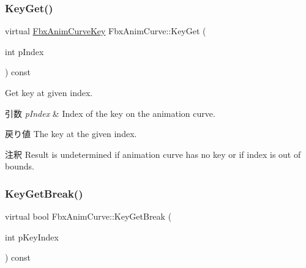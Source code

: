 \subsubsection{\texorpdfstring{Key\+Get()}{KeyGet()}}
{\footnotesize\ttfamily virtual \hyperlink{class_fbx_anim_curve_key}{Fbx\+Anim\+Curve\+Key} Fbx\+Anim\+Curve\+::\+Key\+Get (\begin{DoxyParamCaption}\item[{int}]{p\+Index }\end{DoxyParamCaption}) const\hspace{0.3cm}{\ttfamily [pure virtual]}}

Get key at given index. 
\begin{DoxyParams}{引数}
{\em p\+Index} & Index of the key on the animation curve. \\
\hline
\end{DoxyParams}
\begin{DoxyReturn}{戻り値}
The key at the given index. 
\end{DoxyReturn}
\begin{DoxyRemark}{注釈}
Result is undetermined if animation curve has no key or if index is out of bounds. 
\end{DoxyRemark}
\mbox{\label{class_fbx_anim_curve_a401621f086458975b39fcbcef8e9be77}} 
\subsubsection{\texorpdfstring{Key\+Get\+Break()}{KeyGetBreak()}}
{\footnotesize\ttfamily virtual bool Fbx\+Anim\+Curve\+::\+Key\+Get\+Break (\begin{DoxyParamCaption}\item[{int}]{p\+Key\+Index }\end{DoxyParamCaption}) const\hspace{0.3cm}{\ttfamily [pure virtual]}}

